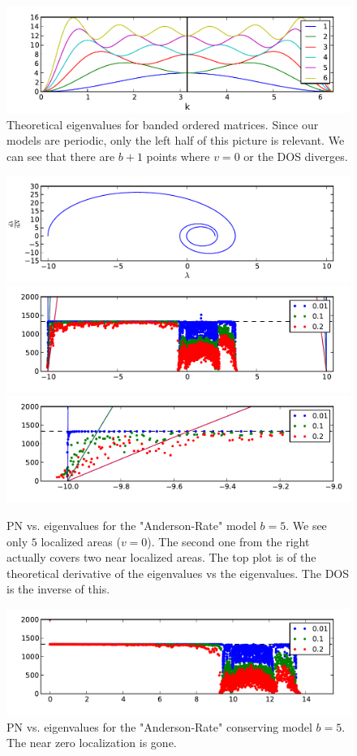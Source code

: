\documentclass[onecolumn,fleqn]{revtex4}
\begin{document}
\begin{figure}[H]
\includegraphics{pta_theor_banded_ev}
\caption{Theoretical eigenvalues for banded ordered matrices. Since our 
models are periodic, only the left half of this picture is relevant.
We can see that there are $b+1$ points where $v=0$ or the DOS diverges.
}\label{fig:theor_banded_ev}
\end{figure}


\begin{figure}[H]
\includegraphics{pta_theor_banded_dos}
\includegraphics{pta_anderson_rates_b5}\\
\includegraphics{pta_anderson_rates_b5_zoom}
\caption{PN vs. eigenvalues for the "Anderson-Rate" model $b=5$.
We see only $5$ localized areas ($v=0$). The second one from the right
actually covers two near localized areas. The top plot is of the theoretical
derivative of the eigenvalues vs the eigenvalues. The DOS is the inverse of this. 
}\label{fig:anderson_rate_b5}
\end{figure}

\begin{figure}[H]
\includegraphics{pta_anderson_rates_conserv_b5}
\caption{PN vs. eigenvalues for the "Anderson-Rate" conserving model $b=5$.
The near zero localization is gone.
}\label{fig:anderson_rate_conserv_b5}
\end{figure}
\end{document}
